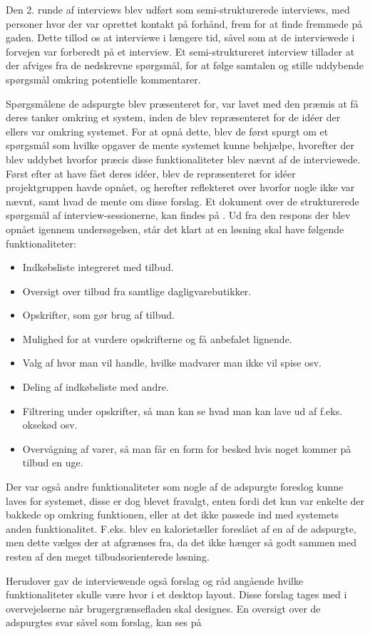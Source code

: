 Den 2. runde af interviews blev udført som semi-strukturerede interviews, med personer hvor der var oprettet kontakt på forhånd, frem for at finde fremmede på gaden.
Dette tillod os at interviewe i længere tid, såvel som at de interviewede i forvejen var forberedt på et interview.
Et semi-struktureret interview tillader at der afviges fra de nedskrevne spørgsmål, for at følge samtalen og stille uddybende spørgsmål omkring potentielle kommentarer.

Spørgsmålene de adspurgte blev præsenteret for, var lavet med den præmis at få deres tanker omkring et system, inden de blev repræsenteret for de idéer der ellers var omkring systemet.
For at opnå dette, blev de først spurgt om et spørgsmål som hvilke opgaver de mente systemet kunne behjælpe, hvorefter der blev uddybet hvorfor præcis disse funktionaliteter blev nævnt af de interviewede.
Først efter at have fået deres idéer, blev de repræsenteret for idéer projektgruppen havde opnået, og herefter reflekteret over hvorfor nogle ikke var nævnt, samt hvad de mente om disse forslag.
Et dokument over de strukturerede spørgsmål af interview-sessionerne, kan findes på . %
Ud fra den respons der blev opnået igennem undersøgelsen, står det klart at en løsning skal have følgende funktionaliteter:

\begin{itemize}
	\item Indkøbsliste integreret med tilbud.
	\item Oversigt over tilbud fra samtlige dagligvarebutikker.
	\item Opskrifter, som gør brug af tilbud. 
	\item Mulighed for at vurdere opskrifterne og få anbefalet lignende.
	\item Valg af hvor man vil handle, hvilke madvarer man ikke vil spise osv.
	\item Deling af indkøbsliste med andre.
	\item Filtrering under opskrifter, så man kan se hvad man kan lave ud af f.eks. oksekød osv. 
	\item Overvågning af varer, så man får en form for besked hvis noget kommer på tilbud en uge.
\end{itemize}

Der var også andre funktionaliteter som nogle af de adspurgte foreslog kunne laves for systemet, disse er dog blevet fravalgt, enten fordi det kun var enkelte der bakkede op omkring funktionen, eller at det ikke passede ind med systemets anden funktionalitet.
F.eks. blev en kalorietæller foreslået af en af de adspurgte, men dette vælges der at afgrænses fra, da det ikke hænger så godt sammen med resten af den meget tilbudsorienterede løsning.

Herudover gav de interviewende også forslag og råd angående hvilke funktionaliteter skulle være hvor i et desktop layout.
Disse forslag tages med i overvejelserne når brugergrænsefladen skal designes.
En oversigt over de adspurgtes svar såvel som forslag, kan ses på %
